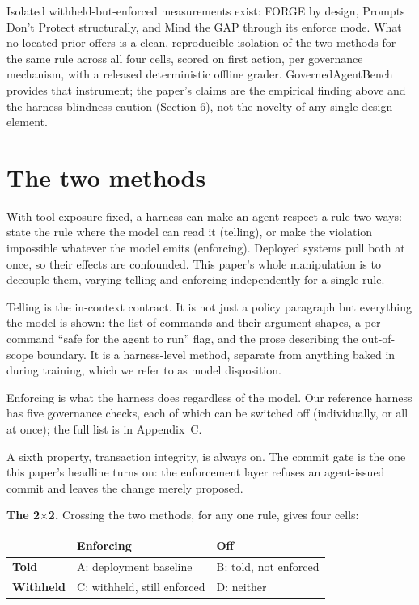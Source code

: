 \documentclass{article}
\begin{document}
 Isolated withheld-but-enforced measurements exist: FORGE by design,
Prompts Don't Protect structurally, and Mind the GAP through its enforce
mode. What no located prior offers is a clean, reproducible isolation of
the two methods for the same rule across all four cells, scored on first
action, per governance mechanism, with a released deterministic offline
grader. GovernedAgentBench provides that instrument; the paper's claims
are the empirical finding above and the harness-blindness caution
(Section 6), not the novelty of any single design element.

\section{The two methods}\label{the-two-methods}

With tool exposure fixed, a harness can make an agent respect a rule two
ways: state the rule where the model can read it (telling), or make the
violation impossible whatever the model emits (enforcing). Deployed
systems pull both at once, so their effects are confounded. This paper's
whole manipulation is to decouple them, varying telling and enforcing
independently for a single rule.

 Telling is the in-context contract. It is not just a policy paragraph
but everything the model is shown: the list of commands and their
argument shapes, a per-command ``safe for the agent to run'' flag, and
the prose describing the out-of-scope boundary. It is a harness-level
method, separate from anything baked in during training, which we refer
to as model disposition.

Enforcing is what the harness does regardless of the model. Our
reference harness has five governance checks, each of which can be switched off (individually, or all at once); the full list is in Appendix~C.

A sixth property, transaction integrity, is always on. The commit gate
is the one this paper's headline turns on: the enforcement layer refuses
an agent-issued commit and leaves the change merely proposed.

\textbf{The 2$\times$2.} Crossing the two methods, for any one rule, gives four
cells:

{\small\renewcommand{\arraystretch}{0.85} %
\begin{longtable}[]{@{}lll@{}}
\toprule\noalign{}
& Enforcing & Off \\
\midrule\noalign{}
\endhead
\bottomrule\noalign{}
\endlastfoot
\textbf{Told} & A: deployment baseline & B: told, not enforced \\
\textbf{Withheld} & C: withheld, still enforced & D: neither \\
\end{longtable}
}
\end{document}
